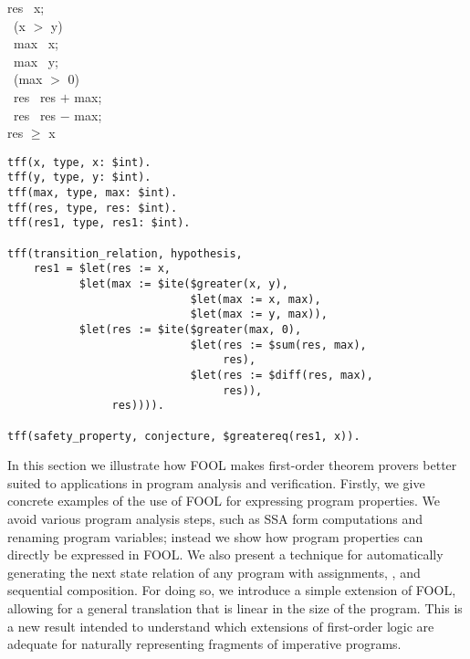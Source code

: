 \begin{figure*}[b]
  \vspace{-1em}
  \begin{center}
    \parbox{0cm}{
      \begin{tabbing}
        res \ass\ x;\\
        \IF\ (x $>$ y) \\\inc
        \THEN\ max \ass\ x;\\
        \ELSE\ max \ass\ y;\\\dec
        \IF\ (max $>$ 0) \\\inc
        \THEN\ res \ass\ res $+$ max;\\
        \ELSE\ res \ass\ res $-$ max;\\[.5em]\dec
         res $\geq$ x
      \end{tabbing}
    }
  \end{center}
  \vspace{-2em}
  \caption{Sequence of conditionals.\label{fig:seqITE}}
\end{figure*}

\begin{figure*}[tb]

\begin{lstlisting}[language=tptp]
tff(x, type, x: $int).
tff(y, type, y: $int).
tff(max, type, max: $int).
tff(res, type, res: $int).
tff(res1, type, res1: $int).

tff(transition_relation, hypothesis,
    res1 = $let(res := x,
           $let(max := $ite($greater(x, y),
                            $let(max := x, max),
                            $let(max := y, max)),
           $let(res := $ite($greater(max, 0),
                            $let(res := $sum(res, max),
                                 res),
                            $let(res := $diff(res, max),
                                 res)),
                res)))).

tff(safety_property, conjecture, $greatereq(res1, x)).
\end{lstlisting}
\caption{Representation of the partial correctness statement of the code on Figure~\ref{fig:seqITE} in Vampire\label{fig:VampireITE}.}
\end{figure*}

In this section we illustrate how FOOL makes first-order theorem
provers better suited to applications in program analysis and
verification.
Firstly,  we give concrete examples of the use of FOOL for
expressing program properties. We avoid various
program analysis steps, such as SSA form computations and renaming
program variables; instead we show how program properties can directly
be expressed in FOOL.
 We also present a technique for
automatically generating the next state relation of any program with
assignments, \ITE, and sequential composition.
For doing so,  we introduce a simple extension of FOOL,
allowing for a general translation that is linear in the size of the
program.
This is a new result intended to understand which extensions of
first-order logic are adequate for naturally representing fragments of
imperative programs.

